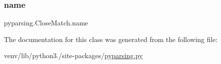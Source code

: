 \mbox{\label{classpyparsing_1_1CloseMatch_a16d5642e29792c98e3fe18dcc5d50925}} 
\subsubsection{\texorpdfstring{name}{name}}
{\footnotesize\ttfamily pyparsing.\+Close\+Match.\+name}



The documentation for this class was generated from the following file\+:\begin{DoxyCompactItemize}
\item 
venv/lib/python3./site-\/packages/\hyperlink{pyparsing_8py}{pyparsing.\+py}\end{DoxyCompactItemize}
